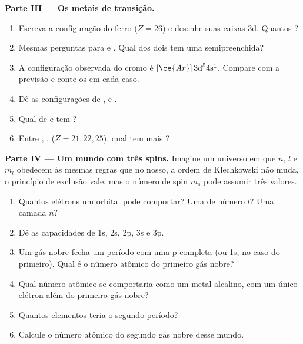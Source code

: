 \begin{problem}
\medskip
\noindent\textbf{Parte III --- Os metais de transição.}
\begin{enumerate}[resume]
  \item Escreva a configuração do ferro ($Z = 26$) e desenhe suas caixas
        3d. Quantos ?
  \item Mesmas perguntas para  e . Qual dos dois
        tem uma  semipreenchida?
  \item A configuração observada do cromo é $[\ce{Ar}]\,3\text{d}^5
        4\text{s}^1$. Compare com a previsão e conte os  em cada caso.
  \item Dê as configurações de ,  e .
  \item Qual de  e  tem ?
  \item Entre , ,  ($Z = 21, 22, 25$),
        qual tem mais ?
\end{enumerate}

\medskip
\noindent\textbf{Parte IV --- Um mundo com três spins.}
Imagine um universo em que $n$, $l$ e $m_l$ obedecem às mesmas regras
que no nosso, a ordem de Klechkowski não muda, o princípio de exclusão
vale, mas o número de spin $m_s$ pode assumir três valores.
\begin{enumerate}[resume]
  \item Quantos elétrons um orbital pode comportar? Uma  de
        número $l$? Uma camada $n$?
  \item Dê as capacidades de 1s, 2s, 2p, 3s e 3p.
  \item Um gás nobre fecha um período com uma  p completa (ou 1s,
        no caso do primeiro). Qual é o número atômico do primeiro gás nobre?
  \item Qual número atômico se comportaria como um metal alcalino, com
        um único elétron além do primeiro gás nobre?
  \item Quantos elementos teria o segundo período?
  \item Calcule o número atômico do segundo gás nobre desse mundo.
\end{enumerate}
\end{problem}
